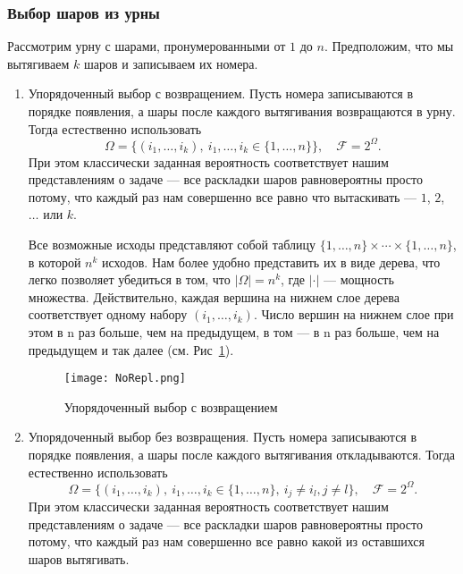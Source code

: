 \documentclass[11 pt,russian]{article}
\begin{document}
\subsubsection{Выбор шаров из урны}
Рассмотрим урну с шарами, пронумерованными от $1$ до $n$. Предположим, что мы вытягиваем $k$ шаров и записываем их номера. \\
\begin{enumerate}
\item Упорядоченный выбор с возвращением. Пусть номера записываются в порядке появления, а шары после каждого вытягивания возвращаются в урну. Тогда естественно использовать 
$$
\Omega = \{(i_1,\dotsc,i_k),\ i_1,\dotsc,i_k\in \{1,\dotsc,n\}\},\quad \mathcal{F} = 2^{\Omega}.
$$
При этом классически заданная вероятность соответствует нашим представлениям о задаче --- все раскладки шаров равновероятны просто потому, что каждый раз нам совершенно все равно что вытаскивать --- $1$, $2$, $\dotsc$ или $k$. 

Все возможные исходы представляют собой таблицу $\{1,\dotsc,n\}\times \dotsm \times \{1,\dotsc,n\}$, в которой $n^k$ исходов. Нам более удобно представить их в виде дерева, что легко позволяет убедиться в том, что $|\Omega| = n^k$, где $|\cdot|$ --- мощность множества. Действительно, каждая вершина на нижнем слое дерева соответствует одному набору $(i_1,\dotsc,i_k)$. Число вершин на нижнем слое при этом в n раз больше, чем на предыдущем, в том --- в n раз больше, чем на предыдущем и так далее (см. Рис~\ref{NoRepl}).
\begin{figure}[h!]
\caption{Упорядоченный выбор с возвращением}
\label{NoRepl}
   \begin{center}
   \texttt{[image: NoRepl.png]}
   \end{center}
\end{figure}
\item Упорядоченный выбор без возвращения. Пусть номера записываются в порядке появления, а шары после каждого вытягивания откладываются. Тогда естественно использовать
$$
\Omega = \{(i_1,\dotsc,i_k),\ i_1,\dotsc,i_k\in \{1,\dotsc,n\},\ i_j\neq i_l, j\neq l\},\quad \mathcal{F} = 2^{\Omega}.
$$
При этом классически заданная вероятность соответствует нашим представлениям о задаче --- все раскладки шаров равновероятны просто потому, что каждый раз нам совершенно все равно какой из оставшихся шаров вытягивать.


\end{enumerate}
\end{document}
